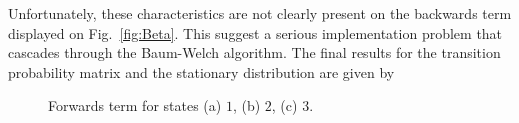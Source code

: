 \documentclass[letterpaper, 10 pt, conference]{ieeeconf}  %
\begin{document}
Unfortunately, these characteristics are not clearly present on the backwards term displayed  on  Fig.~\ref{fig:Beta}.  This suggest a serious implementation problem that cascades through the Baum-Welch algorithm. 
The final results for the transition probability matrix and the stationary distribution are given by

\begin{figure}[ht!]
 \begin{center}
         \caption{Forwards term for  states (a) $1$, (b) $2$, (c) $3$. }
 \label{fig:Alpha}
 \end{center}
\end{figure}
 
\end{document}
